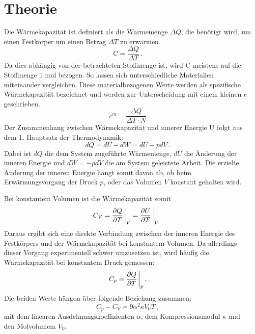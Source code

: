 \section{Theorie}
\label{sec:Theorie}

Die Wärmekapazität ist definiert als die Wärmemenge $\Delta Q$, die benötigt wird, um einen Festkörper um einen Betrag $\Delta T$ zu erwärmen.
\begin{equation}
	\text{C} =  \frac{\Delta Q}{\Delta T} \,.
	\label{eq:C-Def}
\end{equation}
Da dies abhängig von der betrachteten Stoffmenge ist, wird C meistens auf die Stoffmenge 1 mol bezogen. So lassen sich unterschiedliche Materialien miteinander vergleichen. Diese materialbezogenen Werte werden als spezifische Wärmekapazität bezeichnet und werden zur Unterscheidung mit einem kleinen c geschrieben.
\begin{equation}	
	c^m = \frac{\Delta Q}{\Delta T \cdot N}
	\label{eq:c_mol}
\end{equation}
Der Zusammenhang zwischen Wärmekapazität und innerer Energie U folgt aus dem 1. Hauptsatz der Thermodynamik:
\begin{equation}
	dQ = dU - dW = dU - pdV \,.
	\label{eq:1.Haupt}
\end{equation}
Dabei ist $dQ$ die dem System zugeführte Wärmemenge, $dU$ die Änderung der inneren Energie und $dW = - pdV$ die am System geleistete Arbeit.
Die erzielte Änderung der inneren Energie hängt somit davon ab, ob beim Erwärmungsvorgang der Druck $p$, oder das Volumen $V$ konstant gehalten wird.

Bei konstantem Volumen ist die Wärmekapazität somit
\begin{equation}
	C_V = \pdv{Q}{T}\eval_V = \pdv{U}{T}\eval_V \,.
	\label{eq:cv_algemein}
\end{equation}
Daraus ergibt sich eine direkte Verbindung zwischen der inneren Energie des Festkörpers und der Wärmekapazität bei konstantem Volumen. Da allerdings dieser Vorgang experimentell schwer umzusetzen ist, wird häufig die Wärmekapazität bei konstantem Druck gemessen:
\begin{equation}
	C_p = \pdv{Q}{T}\eval_p \,.
	\label{eq:cp_algemein}
\end{equation}
Die beiden Werte hängen über folgende Beziehung zusammen:
\begin{equation}
	C_p - C_V = 9 \alpha^2 \kappa V_0 T \,,
\end{equation}
mit dem linearen Ausdehnungskoeffizienten $\alpha$, dem Kompressionsmodul $\kappa$ und den Molvolumem $V_0$.

